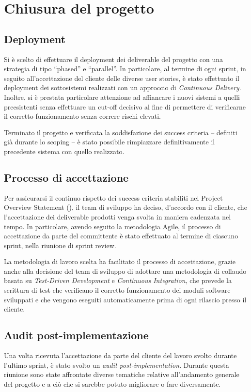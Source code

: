 \chapter{Chiusura del progetto}

\section{Deployment}
Si è scelto di effettuare il deployment dei deliverable del progetto con una strategia di tipo ``phased'' e ``parallel''. In particolare, al termine di ogni sprint, in seguito all'accettazione del cliente delle diverse user stories, è stato effettuato il deployment dei sottosistemi realizzati con un approccio di \emph{Continuous Delivery}.
Inoltre, si è prestata particolare attenzione ad affiancare i nuovi sistemi a quelli preesistenti senza effettuare un cut-off decisivo al fine di permettere di verificarne il corretto funzionamento senza correre rischi elevati.

Terminato il progetto e verificata la soddisfazione dei success criteria -- definiti già durante lo scoping -- è stato possibile rimpiazzare definitivamente il precedente sistema con quello realizzato.

\section{Processo di accettazione}
Per assicurarsi il continuo rispetto dei success criteria stabiliti nel Project Overview Statement (), il team di sviluppo ha deciso, d'accordo con il cliente, che l'accettazione dei deliverable prodotti venga svolta in maniera cadenzata nel tempo.
In particolare, avendo seguito la metodologia Agile, il processo di accettazione da parte del committente è stato effettuato al termine di ciascuno sprint, nella riunione di sprint review.

La metodologia di lavoro scelta ha facilitato il processo di accettazione, grazie anche alla decisione del team di sviluppo di adottare una metodologia di collaudo basata su \emph{Test-Driven Development} e \emph{Continuous Integration}, che prevede la scrittura di test che verificano il corretto funzionamento dei moduli software sviluppati e che vengono eseguiti automaticamente prima di ogni rilascio presso il cliente.


\section{Audit post-implementazione}
Una volta ricevuta l'accettazione da parte del cliente del lavoro svolto durante l'ultimo sprint, è stato svolto un \emph{audit post-implementation}.
Durante questa riunione sono state affrontate diverse tematiche relative all'andamento generale del progetto e a ciò che si sarebbe potuto migliorare o fare diversamente.

